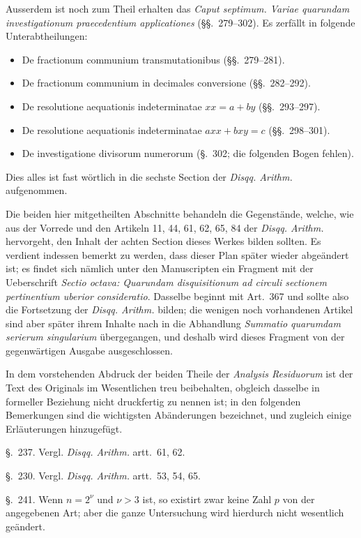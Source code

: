 \documentclass[12pt]{article}
\begin{document}
Ausserdem ist noch zum Theil erhalten das \textit{Caput septimum. Variae quarundam investigationum praecedentium applicationes} (\S\S.~279--302). Es zerfällt in folgende Unterabtheilungen:
\begin{itemize}[noitemsep]
\item De fractionum communium transmutationibus (\S\S.~279--281).
\item De fractionum communium in decimales conversione (\S\S.~282--292).
\item De resolutione aequationis indeterminatae $xx=a+by$ (\S\S.~293--297).
\item De resolutione aequationis indeterminatae $axx+bxy=c$ (\S\S.~298--301).
\item De investigatione divisorum numerorum (\S.~302; die folgenden Bogen fehlen).
\end{itemize}
Dies alles ist fast wörtlich in die sechste Section der \textit{Disqq. Arithm.} aufgenommen.

Die beiden hier mitgetheilten Abschnitte behandeln die Gegenstände, welche, wie aus der Vorrede und den Artikeln 11, 44, 61, 62, 65, 84 der \textit{Disqq. Arithm.} hervorgeht, den Inhalt der achten Section dieses Werkes bilden sollten. Es verdient indessen bemerkt zu werden, dass dieser Plan später wieder abgeändert ist; es findet sich nämlich unter den Manuscripten ein Fragment mit der Ueberschrift \textit{Sectio octava: Quarundam disquisitionum ad circuli sectionem pertinentium uberior consideratio}. Dasselbe beginnt mit Art.~367 und sollte also die Fortsetzung der \textit{Disqq. Arithm.} bilden; die wenigen noch vorhandenen Artikel sind aber später ihrem Inhalte nach in die Abhandlung \textit{Summatio quarumdam serierum singularium} übergegangen, und deshalb wird dieses Fragment von der gegenwärtigen Ausgabe ausgeschlossen.

In dem vorstehenden Abdruck der beiden Theile der \textit{Analysis Residuorum} ist der Text des Originals im Wesentlichen treu beibehalten, obgleich dasselbe in formeller Beziehung nicht druckfertig zu nennen ist; in den folgenden Bemerkungen sind die wichtigsten Abänderungen bezeichnet, und zugleich einige Erläuterungen hinzugefügt.

\S.~237. Vergl. \textit{Disqq. Arithm.} artt.~61, 62.

\S.~230. Vergl. \textit{Disqq. Arithm.} artt.~53, 54, 65.

\S.~241. Wenn $n=2^\nu$ und $\nu>3$ ist, so existirt zwar keine Zahl $p$ von der angegebenen Art; aber die ganze Untersuchung wird hierdurch nicht wesentlich geändert.
\end{document}
